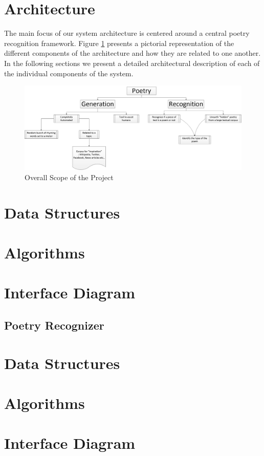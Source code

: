 \documentclass[10pt, letter,twocolumn]{IEEEtran}
\begin{document}
\section{Architecture}
The main focus of our system architecture is centered around a central poetry recognition framework. Figure \ref{big_picture} presents a pictorial representation of the different components of the architecture and how they are related to one another.  In the following sections we present a detailed architectural description of each of the individual components of the system.

\begin{figure}[ht]
  \centering
    \includegraphics[scale=0.5]{Images/Big_Picture}
    \caption{Overall Scope of the Project}
  \label{big_picture}
\end{figure}
\section{Data Structures}
\section{Algorithms}
\section{Interface Diagram}

\subsection{Poetry Recognizer}

\section{Data Structures}
\section{Algorithms}
\section{Interface Diagram}



\end{document}
